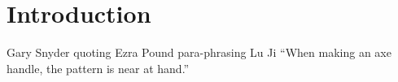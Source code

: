 \chapter[Introduction]{Introduction} \label{ch:intro}







\vspace{-16pt} \begin{chapquote}{Gary Snyder quoting Ezra Pound para-phrasing Lu Ji} \singlespacing ``When making an axe handle, the pattern is near at hand.'' 
 \end{chapquote} \vspace{-8pt}
\noindent\makebox[\linewidth]{\rule{0.5\textwidth}{0.5pt}} \vspace{1pt}


	


